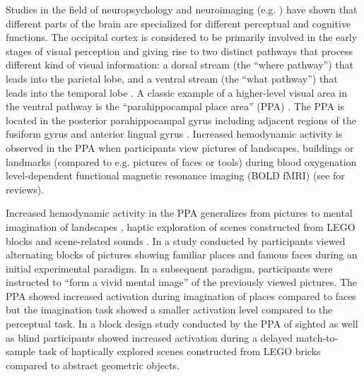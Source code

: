 \documentclass[english]{article}
\begin{document}
Studies in the field of neuropsychology and neuroimaging (e.g.
\citep{penfield1950cerebral, fox1984noninvasive}) have shown that different
parts of the brain are specialized for different perceptual and cognitive
functions.
The occipital cortex is considered to be primarily involved in the early stages
of visual perception and giving rise to two distinct pathways that process
different kind of visual information:
a dorsal stream (the ``where pathway'') that leads into the parietal lobe, and a
ventral stream (the ``what pathway'') that leads into the temporal lobe
\citep{goodale1992separate, mishkin1982contribution}.
A classic example of a higher-level visual area in the ventral pathway is the
``parahippocampal place area'' (PPA) \citep{epstein1998ppa,
epstein1999parahippocampal}.
The PPA is located in the posterior parahippocampal gyrus including adjacent
regions of the fusiform gyrus and anterior lingual gyrus
\citep{epstein2008parahippocampal}.
Increased hemodynamic activity is observed in the PPA when participants view
pictures of landscapes, buildings or landmarks (compared to e.g. pictures of
faces or tools) during blood oxygenation level-dependent functional magnetic
resonance imaging (BOLD fMRI) (see \citep{epstein2014neural, aminoff2013role}
for reviews).

Increased hemodynamic activity in the PPA generalizes from pictures to mental
imagination of landscapes \citep{ocraven2000mental}, haptic exploration of
scenes constructed from LEGO blocks \citep{wolbers2011modality} and
scene-related sounds \citep{van2017development}.
In a study conducted by \cite{ocraven2000mental} participants viewed alternating
blocks of pictures showing familiar places and famous faces during an initial
experimental paradigm.
In a subsequent paradigm, participants were instructed to ``form a vivid mental
image'' of the previously viewed pictures.
The PPA showed increased activation during imagination of places compared to
faces but the imagination task showed a smaller activation level compared to
the perceptual task.
In a block design study conducted by \cite{wolbers2011modality} the PPA of
sighted as well as blind participants showed increased activation during a
delayed match-to-sample task of haptically explored scenes constructed from LEGO
bricks compared to abstract geometric objects.
\end{document}
